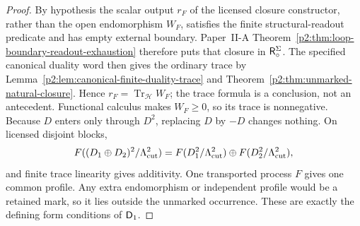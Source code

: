 \documentclass[12pt,a4paper]{article}
\begin{document}
\begin{proof}
By hypothesis the scalar output \(r_F\) of the licensed closure constructor,
rather than the open endomorphism \(W_F\), satisfies the finite
structural-readout predicate and has empty external boundary.  Paper~II-A
Theorem~\ref{p2:thm:loop-boundary-readout-exhaustion} therefore puts that
closure in \(\mathsf R_{\circ}^{\Sigma}\). The specified canonical duality word then gives
the ordinary trace by Lemma~\ref{p2:lem:canonical-finite-duality-trace}
and Theorem~\ref{p2:thm:unmarked-natural-closure}.  Hence
\(r_F=\operatorname{Tr}_{\mathcal H}W_F\); the trace formula is a conclusion,
not an antecedent.  Functional calculus makes
\(W_F\ge0\), so its trace is nonnegative.  Because \(D\) enters only through
\(D^2\), replacing \(D\) by \(-D\) changes nothing.  On licensed disjoint
blocks,
\[
 F((D_1\oplus D_2)^2/\Lambda_{\mathrm{cut}}^2)
 =F(D_1^2/\Lambda_{\mathrm{cut}}^2)\oplus F(D_2^2/\Lambda_{\mathrm{cut}}^2),
\]
and finite trace linearity gives additivity.  One transported process
\(F\) gives one common profile.  Any extra endomorphism or independent profile
would be a retained mark, so it lies outside the unmarked occurrence.  These
are exactly the defining form conditions of \(\mathsf{D}_1\).
\end{proof}
\end{document}
